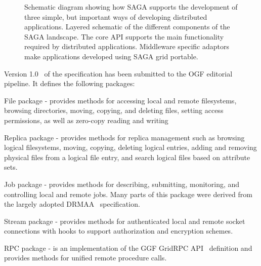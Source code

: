\documentclass{llncs}
\begin{document}
\begin{figure}[!h]
  \begin{center}
  \end{center}
  \caption{Schematic diagram showing how SAGA supports the development
    of three simple, but important ways of developing distributed
    applications. Layered schematic of the different components of the
    SAGA landscape. The core API supports the main functionality
    required by distributed applications.  Middleware specific
    adaptors make applications developed using SAGA grid portable.}
  \label{sagalayer}
\end{figure}


\noindent Version 1.0~\cite{saga-core} of the specification has been submitted
to the OGF editorial pipeline.  It defines the following packages:
\begin{compactitem}
\item File package - provides methods for accessing local and remote
  filesystems, browsing directories, moving, copying, and deleting
  files, setting access permissions, as well as zero-copy reading and
  writing
\item Replica package - provides methods for replica management such
  as browsing logical filesystems, moving, copying, deleting logical
  entries, adding and removing physical files from a logical file
  entry, and search logical files based on attribute sets.
\item Job package - provides methods for describing, submitting,
  monitoring, and controlling local and remote jobs. Many parts of
  this package were derived from the largely adopted
  DRMAA~\cite{drmaa_url} specification.
\item Stream package - provides methods for authenticated local and
  remote socket connections with hooks to support authorization and
  encryption schemes.
\item RPC package - is an implementation of the GGF GridRPC
  API~\cite{gridrpc_url} definition and provides methods for unified
  remote procedure calls.
\end{compactitem}
\end{document}
